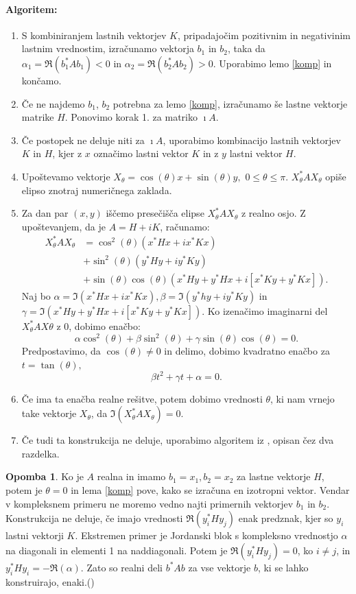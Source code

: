 \documentclass[12pt,a4paper]{amsart}
\theoremstyle{definition}
\newtheorem{opomba}[definicija]{Opomba}
\theoremstyle{plain}
\begin{document}
\paragraph{Algoritem:}
\begin{enumerate}[1.]
\item S kombiniranjem lastnih vektorjev $K$, pripadajočim pozitivnim in negativinim lastnim vrednostim, izračunamo vektorja $b_1$ in $b_2$, taka da  $\alpha_1=\Re(b_1^\ast Ab_1)<0$ in $\alpha_2=\Re(b_2^\ast Ab_2)>0$. Uporabimo lemo \ref{komp} in končamo.
\item Če ne najdemo $b_1$, $b_2$ potrebna za lemo \ref{komp}, izračunamo še lastne vektorje matrike $H$.  Ponovimo korak 1. za matriko $\imath A$.
\item Če postopek ne deluje niti za $\imath A$, uporabimo kombinacijo lastnih vektorjev $K$ in $H$, kjer z $x$ označimo lastni vektor $K$ in z $y$ lastni vektor $H$.
\item Upoštevamo vektorje $X_\theta =\cos(\theta)x+\sin(\theta)y,$ $0\le\theta\le\pi$. $X_\theta ^\ast AX_\theta$ opiše elipso znotraj numeričnega zaklada.
\item Za dan par $(x,y)$ iščemo presečišča elipse $X_\theta ^\ast AX_\theta$ z realno osjo. Z u\-po\-šte\-va\-njem, da je $A=H+iK$, računamo:
\begin{align*}
X_\theta^\ast AX_\theta &= \cos^2(\theta)(x^\ast Hx + ix^\ast Kx)\\ 
&+ \sin^2(\theta)(y^\ast Hy + iy^\ast Ky)\\ 
&+\sin(\theta)\cos(\theta)(x^\ast Hy +y^\ast Hx +i[x^\ast Ky +y^\ast Kx]).
\end{align*}
Naj bo $\alpha=\Im(x^\ast Hx + ix^\ast Kx), \beta=\Im(y^\ast hy +iy^\ast Ky)$ in $\gamma=\Im(x^\ast Hy +y^\ast Hx +i[x^\ast Ky +y^\ast Kx]).$ Ko izenačimo imaginarni del $X_\theta ^\ast AX\theta$ z 0, dobimo enačbo:
$$\alpha \cos^2(\theta) +\beta \sin^2(\theta) +\gamma \sin(\theta)\cos(\theta)=0.$$
Predpostavimo, da $\cos(\theta) \not =0$ in delimo, dobimo kvadratno enačbo za $t=\tan(\theta),$
$$\beta t^2 +\gamma t +\alpha =0.$$
\item Če ima ta enačba realne rešitve, potem dobimo vrednosti $\theta$, ki nam vrnejo take vektorje $X_\theta$, da $\Im(X_\theta ^\ast AX_\theta)=0$.
\item Če tudi ta konstrukcija ne deluje, uporabimo algoritem iz \cite{trije}, opisan čez dva razdelka.
\end{enumerate}

\begin{opomba}
Ko je $A$ realna in imamo $b_1=x_1, b_2=x_2$ za lastne vektorje $H$, potem je $\theta=0$ in lema \ref{komp} pove, kako se izračuna en izotropni vektor. Vendar v kompleksnem primeru ne moremo vedno najti primernih vektorjev $b_1$ in $b_2$. Konstrukcija ne deluje, če imajo vrednosti $\Re(y_i^\ast Hy_j)$ enak predznak, kjer so $y_i$ lastni vektorji $K.$ Ekstremen primer je Jordanski blok s kompleksno vrednostjo $\alpha$ na diagonali in elementi 1 na naddiagonali. Potem je $\Re(y_i^\ast Hy_j)=0$, ko $i\not=j$, in $y_i^\ast Hy_i=-\Re(\alpha)$. Zato so realni deli $b^\ast Ab$ za vse vektorje $b$, ki se lahko konstruirajo, enaki.(\cite{meurant})
\end{opomba}
\end{document}
